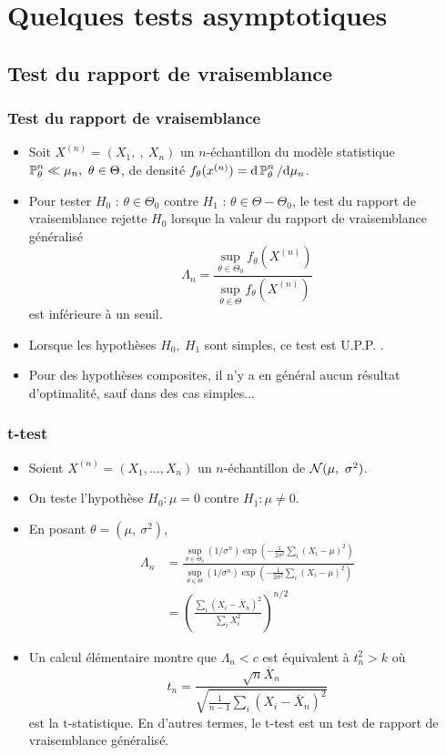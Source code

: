 \section{Quelques tests asymptotiques}

\subsection{Test du rapport de vraisemblance}
\begin{frame}
\frametitle{Test du rapport de vraisemblance}
 \begin{itemize}
 \item Soit  $X^{(n)}= (X_{1},\ ,\ X_{n})$ un $n$-échantillon du modèle statistique $\PP_{\theta}^{n}\ll\mu_{n},\ \theta\in\Theta$, de densité  $f_{\theta}(x^{(n)})= \mathrm{d} \operatorname{{\mathbb P}}_{\theta}^{n}/ \mathrm{d} \mu_{n}$.
 \item Pour tester $H_{0}$ : $\theta\in\Theta_{0}$  contre $H_{1}$ : $\theta\in\Theta-\Theta_{0}$, le test du \alert{rapport de vraisemblance} rejette $H_{0}$ lorsque la valeur du \alert{rapport de vraisemblance généralisé}
$$
\Lambda_{n}=\frac{\sup_{\theta\in\Theta_{0}}f_{\theta}(X^{(n)})}{\sup_{\theta\in\Theta}f_{\theta}(X^{(n)})}
$$
est inférieure à un seuil.
\item   Lorsque les hypothèses $H_{0},\ H_{1}$ sont simples, ce test est U.P.P. .
\item Pour des hypothèses composites, il n'y a en général aucun résultat d'optimalité, sauf dans des cas simples...
\end{itemize}
\end{frame}

\begin{frame}
\frametitle{t-test}
\begin{itemize}
\item  Soient $X^{(n)}= (X_{1}, \dots, X_{n})$ un $n$-échantillon de $\mathcal{N}(\mu,\ \sigma^{2})$.
\item On teste l'hypothèse $H_0: \mu =0$ contre $H_1: \mu \ne 0$.
\item En posant $\theta=(\mu,\ \sigma^{2})$,
\begin{align*}
\Lambda_{n}&=\frac{\sup_{\theta\in\Theta_{0}}(1/\sigma^{n})\exp(-\frac{1}{2\sigma^{2}}\sum_{i}(X_{i}-\mu)^{2})}{\sup_{\theta\in\Theta}(1/\sigma^{n})\exp(-\frac{1}{2\sigma^{2}}\sum_{i}(X_{i}-\mu)^{2})}\\
&=(\frac{\sum_{i}(X_{i}-\overline{X}_{n})^{2}}{\sum_{i}X_{i}^{2}})^{n/2}
\end{align*}
\item Un calcul élémentaire montre que $\Lambda_{n}<c$ est équivalent à $t_{n}^{2}>k$ où
$$
t_{n}=\frac{\sqrt{n}\overline{X}_{n}}{\sqrt{\frac{1}{n-1}\sum_{i}(X_{i}-\overline{X}_{n})^{2}}}
$$
est la $\mathrm{t}$-statistique. En d'autres termes, le $\mathrm{t}$-test est un test de rapport de vraisemblance généralisé.
\end{itemize}
\end{frame}

